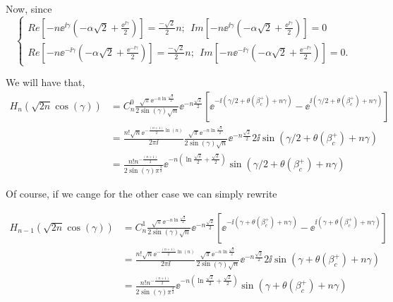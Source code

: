 Now, since
\begin{equation*}
	\begin{cases}
	Re[- n \ee^{\ii \gamma} (-\alpha \sqrt{2} + \frac{ \ee^{\ii \gamma}}{2})]= \frac{-\sqrt{2}}{2}  n; \ \ Im[- n \ee^{\ii \gamma} (-\alpha \sqrt{2} + \frac{ \ee^{\ii \gamma}}{2})] = 0 \\
	Re[ - n \ee^{-\ii \gamma} (-\alpha \sqrt{2} + \frac{ \ee^{-\ii \gamma}}{2})] = \frac{-\sqrt{2}}{2}  n; \ \  Im[ - n \ee^{-\ii \gamma} (-\alpha \sqrt{2} + \frac{ \ee^{-\ii \gamma}}{2})] = 0 .
	\end{cases}
\end{equation*}

We will have that,
\begin{equation*}
	\begin{split}
		H_n(\sqrt{2n}\cos(\gamma)) &=   C_n^0 \frac{\sqrt{\pi} \ee^{-n\ln{\frac{\sqrt{2}}{2}}}}{2 \sin{(\gamma)}\sqrt{n}} \ee^{-n \frac{\sqrt{2}}{2}} \left[ \ee^{-\ii(\gamma/2 + \theta(\beta_c^+) + n \gamma)}  -  \ee^{\ii(\gamma/2 + \theta(\beta_c^+) + n \gamma) }  \right]  \\
		&=  \frac{n! \sqrt{n} \ee^{-\frac{(n+1)}{2} \ln{(n)}}}{2\pi \ii}  \frac{\sqrt{\pi} \ee^{-n\ln{\frac{\sqrt{2}}{2}}}}{2 \sin{(\gamma)}\sqrt{n}} \ee^{-n \frac{\sqrt{2}}{2}} 2\ii \sin{\left(\gamma/2 + \theta(\beta_c^+) + n \gamma \right)} \\
		&= \frac{n!  n^{-\frac{(n+1)}{2}}}{2 \sin{(\gamma)} \pi^{\frac{3}{2}}} \ee^{-n \left( \ln{\frac{\sqrt{2}}{2}} + \frac{\sqrt{2}}{2} \right)} \sin{\left(\gamma/2 + \theta(\beta_c^+) + n \gamma \right)} 
	\end{split}
\end{equation*}

Of course, if we cange for the other case we can simply rewrite

\begin{equation*}
	\begin{split}
		H_{n-1}(\sqrt{2n}\cos(\gamma)) &=   C_n^1 \frac{\sqrt{\pi} \ee^{-n\ln{\frac{\sqrt{2}}{2}}}}{2 \sin{(\gamma)}\sqrt{n}} \ee^{-n \frac{\sqrt{2}}{2}} \left[ \ee^{-\ii(\gamma + \theta(\beta_c^+) + n \gamma)}  -  \ee^{\ii(\gamma + \theta(\beta_c^+) + n \gamma) }  \right]  \\
		&=  \frac{n! \sqrt{n} \ee^{-\frac{(n+1)}{2} \ln{(n)}}}{2\pi \ii}  \frac{\sqrt{\pi} \ee^{-n\ln{\frac{\sqrt{2}}{2}}}}{2 \sin{(\gamma)}\sqrt{n}} \ee^{-n \frac{\sqrt{2}}{2}} 2\ii \sin{\left(\gamma + \theta(\beta_c^+) + n \gamma \right)} \\
		&= \frac{n!  n^{-\frac{(n+1)}{2}}}{2 \sin{(\gamma)} \pi^{\frac{3}{2}}} \ee^{-n \left( \ln{\frac{\sqrt{2}}{2}} + \frac{\sqrt{2}}{2} \right)} \sin{\left(\gamma + \theta(\beta_c^+) + n \gamma \right)} 
	\end{split}
\end{equation*}

